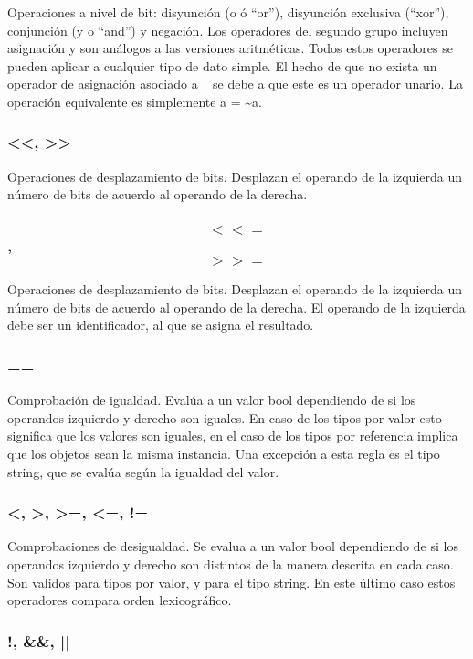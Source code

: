 \documentclass[12pt,twoside]{book}
\begin{document}
Operaciones a nivel de bit: disyunción (o ó ``or''), disyunción exclusiva (``xor''), conjunción (y o ``and'') y negación. Los operadores del segundo grupo incluyen asignación y son análogos a las versiones aritméticas. Todos estos operadores se pueden aplicar a cualquier tipo de dato simple. El hecho de que no exista un operador de asignación asociado a ~ se debe a que este es un operador unario. La operación equivalente es simplemente a = \~{}a.

\subsubsection{<<, >>}
Operaciones de desplazamiento de bits. Desplazan el operando de la izquierda un número de bits de acuerdo al operando de la derecha.

\subsubsection{$$<<=$$, $$>>=$$}

Operaciones de desplazamiento de bits. Desplazan el operando de la izquierda un número de bits de acuerdo al operando de la derecha. El operando de la izquierda debe ser un identificador, al que se asigna el resultado.

\subsubsection{==}

Comprobación de igualdad. Evalúa a un valor bool dependiendo de si los operandos izquierdo y derecho son iguales. En caso de los tipos por valor esto significa que los valores son iguales, en el caso de los tipos por referencia implica que los objetos sean la misma instancia. Una excepción a esta regla es el tipo string, que se evalúa según la igualdad del valor.

\subsubsection{<, >, >=, <=, !=}

Comprobaciones de desigualdad. Se evalua a un valor bool dependiendo de si los operandos izquierdo y derecho son distintos de la manera descrita en cada caso. Son validos para tipos por valor, y para el tipo string. En este último caso estos operadores compara orden lexicográfico.

\subsubsection{!, \&\&, ||}
\end{document}
